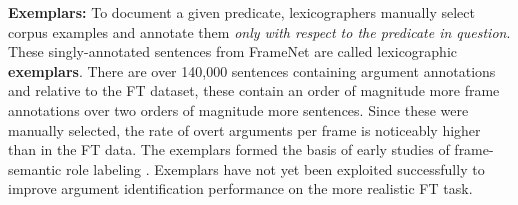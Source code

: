 \documentclass[11pt,a4paper]{article}
\newcommand{\ensuretext}[1]{#1}
\newcommand{\nssmarker}{\ensuretext{\textcolor{magenta}{\ensuremath{^{\textsc{NS}}_{\textsc{S}}}}}}
\newcommand{\mkmarker}{\ensuretext{\textcolor{red}{\ensuremath{^{\textsc{M}}_{\textsc{K}}}}}}
\newcommand{\stmarker}{\ensuretext{\textcolor{orange}{\ensuremath{^{\textsc{S}}_{\textsc{T}}}}}}
\newcommand{\arkcomment}[3]{\ensuretext{\textcolor{#3}{[#1 #2]}}}
\newcommand{\nss}[1]{\arkcomment{\nssmarker}{#1}{magenta}}
\newcommand{\mk}[1]{\arkcomment{\mkmarker}{#1}{red}}
\newcommand{\st}[1]{\arkcomment{\stmarker}{#1}{orange}}
\begin{document}
\noindent\textbf{Exemplars:} To document a given predicate, lexicographers manually select corpus examples and annotate them
\emph{only with respect to the predicate in question}.
These singly-annotated sentences from FrameNet are called lexicographic \textbf{exemplars}.
There are over 140,000 sentences containing argument annotations %
and relative to the FT dataset, these contain an order of magnitude more frame annotations
over two orders of magnitude 
more sentences. Since these were manually selected, the rate of overt arguments per frame
is noticeably higher than in the FT data.
The exemplars formed the basis of early studies of frame-semantic role
labeling \citep[e.g.,][]{gildea-02,thompson-03,fleischman-03,litkowski-04,kwon-04}.
Exemplars have not yet been exploited successfully to improve
argument identification performance on the more realistic FT task.
\end{document}
